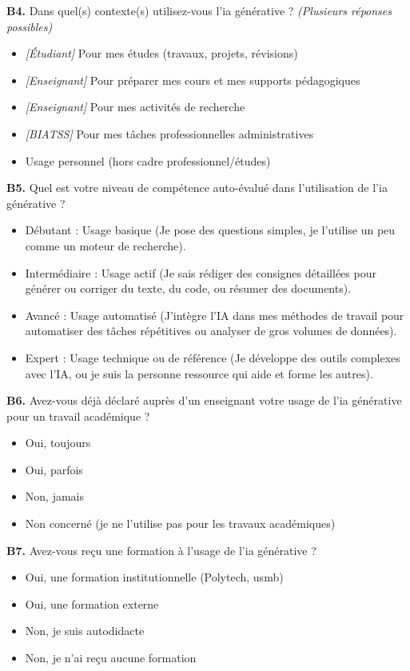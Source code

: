 \textbf{B4.} Dans quel(s) contexte(s) utilisez-vous l'\gls{ia} générative ? \textit{(Plusieurs réponses possibles)}
\begin{itemize}[label=$\square$, leftmargin=1.5cm]
  \item \textit{[Étudiant]} Pour mes études (travaux, projets, révisions)
  \item \textit{[Enseignant]} Pour préparer mes cours et mes supports pédagogiques
  \item \textit{[Enseignant]} Pour mes activités de recherche
  \item \textit{[BIATSS]} Pour mes tâches professionnelles administratives
  \item Usage personnel (hors cadre professionnel/études)
\end{itemize}

\textbf{B5.} Quel est votre niveau de compétence auto-évalué dans l'utilisation de l'\gls{ia} générative ?
\begin{itemize}[label=$\square$, leftmargin=1.5cm]
  \item Débutant : Usage basique (Je pose des questions simples, je l'utilise un peu comme un moteur de recherche).
  \item Intermédiaire : Usage actif (Je sais rédiger des consignes détaillées pour générer ou corriger du texte, du code, ou résumer des documents).
  \item Avancé : Usage automatisé (J'intègre l'IA dans mes méthodes de travail pour automatiser des tâches répétitives ou analyser de gros volumes de données).
  \item Expert : Usage technique ou de référence (Je développe des outils complexes avec l'IA, ou je suis la personne ressource qui aide et forme les autres).
\end{itemize}

\textbf{B6.} Avez-vous déjà déclaré auprès d'un enseignant votre usage de l'\gls{ia} générative pour un travail académique ?
\begin{itemize}[label=$\square$, leftmargin=1.5cm]
  \item Oui, toujours
  \item Oui, parfois
  \item Non, jamais
  \item Non concerné (je ne l'utilise pas pour les travaux académiques)
\end{itemize}

\textbf{B7.} Avez-vous reçu une formation à l'usage de l'\gls{ia} générative ?
\begin{itemize}[label=$\square$, leftmargin=1.5cm]
  \item Oui, une formation institutionnelle (Polytech, \gls{usmb})
  \item Oui, une formation externe
  \item Non, je suis autodidacte
  \item Non, je n'ai reçu aucune formation
\end{itemize}

